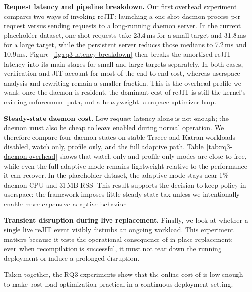 \noindent\textbf{Request latency and pipeline breakdown.}
Our first overhead experiment compares two ways of invoking reJIT: launching a one-shot daemon process per request versus sending requests to a long-running daemon server. In the current placeholder dataset, one-shot requests take 23.4\,ms for a small target and 31.8\,ms for a large target, while the persistent server reduces those medians to 7.2\,ms and 10.9\,ms. Figure~\ref{fig:rq3-latency-breakdown} then breaks the amortized reJIT latency into its main stages for small and large targets separately. In both cases, verification and JIT account for most of the end-to-end cost, whereas userspace analysis and rewriting remain a smaller fraction. This is the overhead profile we want: once the daemon is resident, the dominant cost of reJIT is still the kernel's existing enforcement path, not a heavyweight userspace optimizer loop.



\noindent\textbf{Steady-state daemon cost.}
Low request latency alone is not enough; the daemon must also be cheap to leave enabled during normal operation. We therefore compare four daemon states on stable Tracee and Katran workloads: disabled, watch only, profile only, and the full adaptive path. Table~\ref{tab:rq3-daemon-overhead} shows that watch-only and profile-only modes are close to free, while even the full adaptive mode remains lightweight relative to the performance it can recover. In the placeholder dataset, the adaptive mode stays near 1\% daemon CPU and 31\,MB RSS. This result supports the decision to keep policy in userspace: the framework imposes little steady-state tax unless we intentionally enable more expensive adaptive behavior.



\noindent\textbf{Transient disruption during live replacement.}
Finally, we look at whether a single live reJIT event visibly disturbs an ongoing workload. This experiment matters because it tests the operational consequence of in-place replacement: even when recompilation is successful, it must not tear down the running deployment or induce a prolonged disruption.



Taken together, the RQ3 experiments show that the online cost of \tool is low enough to make post-load optimization practical in a continuous deployment setting.

